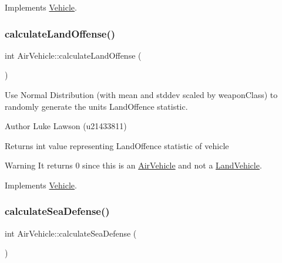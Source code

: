 Implements \mbox{\hyperlink{class_vehicle_a155724a3ab7689c7bafb970ad47ac0df}{Vehicle}}.

\mbox{\label{class_air_vehicle_afbbfd8dd22d786ca679669f2ae5f9f41}} 
\subsubsection{\texorpdfstring{calculateLandOffense()}{calculateLandOffense()}}
{\footnotesize\ttfamily int Air\+Vehicle\+::calculate\+Land\+Offense (\begin{DoxyParamCaption}{ }\end{DoxyParamCaption})\hspace{0.3cm}{\ttfamily [virtual]}}



Use Normal Distribution (with mean and stddev scaled by weapon\+Class) to randomly generate the unit\textquotesingle{}s Land\+Offence statistic. 

\begin{DoxyAuthor}{Author}
Luke Lawson (u21433811) 
\end{DoxyAuthor}
\begin{DoxyReturn}{Returns}
int value representing Land\+Offence statistic of vehicle 
\end{DoxyReturn}
\begin{DoxyWarning}{Warning}
It returns 0 since this is an \mbox{\hyperlink{class_air_vehicle}{Air\+Vehicle}} and not a \mbox{\hyperlink{class_land_vehicle}{Land\+Vehicle}}. 
\end{DoxyWarning}


Implements \mbox{\hyperlink{class_vehicle_a6b272c05209a8907ebe6229e66317f4a}{Vehicle}}.

\mbox{\label{class_air_vehicle_a6a0912049937756912347a75cbd74c1b}} 
\subsubsection{\texorpdfstring{calculateSeaDefense()}{calculateSeaDefense()}}
{\footnotesize\ttfamily int Air\+Vehicle\+::calculate\+Sea\+Defense (\begin{DoxyParamCaption}{ }\end{DoxyParamCaption})\hspace{0.3cm}{\ttfamily [virtual]}}



